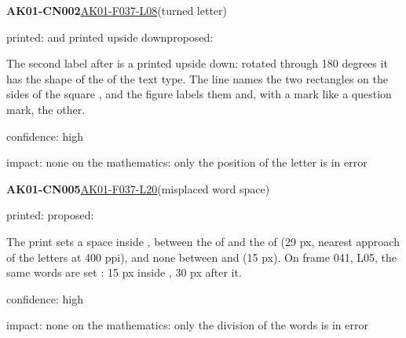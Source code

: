 \documentclass[11pt]{article}
\begin{document}
\noindent\textbf{AK01-CN002}\enspace\hyperlink{AK01-F037-L08}{AK01-F037-L08}\enspace(turned letter)\par\noindent printed:  and  printed upside down\enspace proposed: \par\noindent The second label after  is a  printed upside down: rotated through 180 degrees it has the shape of the  of the text type. The line names the two rectangles on the sides of the square , and the figure labels them  and, with a mark like a question mark, the other.\par\noindent confidence: high\par\noindent impact: none on the mathematics: only the position of the letter is in error\par\medskip
\noindent\textbf{AK01-CN005}\enspace\hyperlink{AK01-F037-L20}{AK01-F037-L20}\enspace(misplaced word space)\par\noindent printed: \enspace proposed: \par\noindent The print sets a space inside , between the  of  and the  of  (29 px, nearest approach of the letters at 400 ppi), and none between  and  (15 px). On frame 041, L05, the same words are set : 15 px inside , 30 px after it.\par\noindent confidence: high\par\noindent impact: none on the mathematics: only the division of the words is in error\par\medskip
\end{document}

